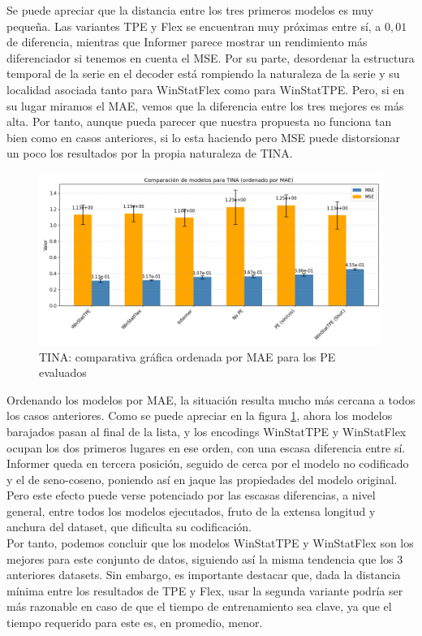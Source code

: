 Se puede apreciar que la distancia entre los tres primeros modelos es muy pequeña. Las variantes TPE y Flex se encuentran muy próximas entre sí, a $0,01$ de diferencia, mientras que Informer parece mostrar un rendimiento más diferenciador si tenemos en cuenta el MSE. Por su parte, desordenar la estructura temporal de la serie en el decoder está rompiendo la naturaleza de la serie y su localidad asociada tanto para WinStatFlex como para WinStatTPE. Pero, si en su lugar miramos el MAE, vemos que la diferencia entre los tres mejores es más alta. Por tanto, aunque pueda parecer que nuestra propuesta no funciona tan bien como en casos anteriores, si lo esta haciendo pero MSE puede distorsionar un poco los resultados por la propia naturaleza de TINA.\\

\begin{figure}[!ht]
	\centering
	\includegraphics[scale=0.45]{img/tinafinal2}
	\caption{TINA: comparativa gráfica ordenada por MAE para los PE evaluados}
	\label{tinafinal2}
\end{figure}

Ordenando los modelos por MAE, la situación resulta mucho más cercana a todos los casos anteriores. Como se puede apreciar en la figura \ref{tinafinal2}, ahora los modelos barajados pasan al final de la lista, y los encodings WinStatTPE y WinStatFlex ocupan los dos primeros lugares en ese orden, con una escasa diferencia entre sí. Informer queda en tercera posición, seguido de cerca por el modelo no codificado y el de seno-coseno, poniendo así en jaque las propiedades del modelo original. Pero este efecto puede verse potenciado por las escasas diferencias, a nivel general, entre todos los modelos ejecutados, fruto de la extensa longitud y anchura del dataset, que dificulta su codificación.\\

Por tanto, podemos concluir que los modelos WinStatTPE y WinStatFlex son los mejores para este conjunto de datos, siguiendo así la misma tendencia que los 3 anteriores datasets. Sin embargo, es importante destacar que, dada la distancia mínima entre los resultados de TPE y Flex, usar la segunda variante podría ser más razonable en caso de que el tiempo de entrenamiento sea clave, ya que el tiempo requerido para este es, en promedio, menor.

